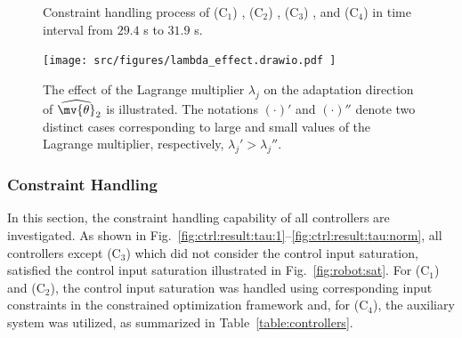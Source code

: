 \documentclass[journal]{IEEEtran}
\begin{document}
\begin{figure}[t]
    \centering
    \subfloat[Control input $\tau$ locus in time interval from $29.4$ s to $31.9$ s.]{
        \texttt{[image: 
            src/measurement/figures/compare/Fig6.eps
        ]}%
        \label{fig:ctrl:result:scope:control}}
        \vfill
        \vfill
  \caption{
    Constraint handling process of (C$_1$) \protect{}, (C$_2$) \protect{}, (C$_3$) \protect{}, and (C$_4$) \protect{} in time interval from $29.4$ s to $31.9$ s.
  }
\label{fig:ctrl:result:scope}
\end{figure}

\begin{figure}[!t]
	\centering
	\texttt{[image: 
		src/figures/lambda\_effect.drawio.pdf
		]}
	\caption{
        The effect of the Lagrange multiplier $\lambda_{j}$ on the adaptation direction of $\widehat{\mv{\theta}}_2$ is illustrated. 
        The notations $(\cdot)'$ and $(\cdot)''$ denote two distinct cases corresponding to large and small values of the Lagrange multiplier, respectively, \ie $\lambda_{j}' > \lambda_{j}''$.
	}
	\label{fig:lambda_effect}
\end{figure}

\hfill

\subsubsection{Constraint Handling} \label{sec:sim:constraint}

In this section, the constraint handling capability of all controllers are investigated.
As shown in Fig.~\ref{fig:ctrl:result:tau:1}–\ref{fig:ctrl:result:tau:norm}, all controllers except (C$_3$) which did not consider the control input saturation, satisfied the control input saturation illustrated in Fig.~\ref{fig:robot:sat}.
For (C$_1$) and (C$_2$), the control input saturation was handled using corresponding input constraints in the constrained optimization framework and, for (C$_4$), the auxiliary system was utilized, as summarized in Table~\ref{table:controllers}.
\end{document}
